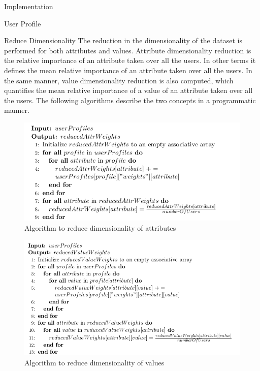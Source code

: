 \documentclass{report}
\begin{document}
\begin{projChapter}{Implementation}
\begin{projSection}{User Profile}
\end{projSection}
\begin{projSection}{Reduce Dimensionality}
            The reduction in the dimensionality of the dataset is performed for both attributes and values. Attribute dimensionality reduction is the relative importance of an attribute taken over all the users. In other terms it defines the mean relative importance of an attribute taken over all the users. In the same manner, value dimensionality reduction is also computed, which quantifies the mean relative importance of a value of an attribute taken over all the users. The following algorithms describe the two concepts in a programmatic manner.
            \begin{figure}[ht!]
\centering
\includegraphics[scale=0.6]{images/dimredattrib.png}
\caption{Algorithm to reduce dimensionality of attributes}
\label{dimredattrib}
\end{figure}

\begin{figure}[ht!]
\centering
\includegraphics[scale=0.6]{images/dimredvalue.png}
\caption{Algorithm to reduce dimensionality of values}
\label{dimredvalue}
\end{figure}


\end{projSection}
\end{projChapter}
\end{document}
